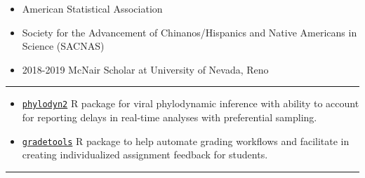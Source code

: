 \documentclass{article}
\begin{document}
	
	
	\begin{description}
		\vspace{-2mm}
		\item[Programs and Professional Membership]\hspace*{.01in}
		
		\begin{itemize}
			\item American Statistical Association
			
			\item Society for the Advancement of Chinanos/Hispanics and Native Americans in Science (SACNAS)
			
			\item 2018-2019 McNair Scholar at University of Nevada, Reno
		\end{itemize}
	\end{description}
	\vspace{-2mm}
	\rule{\linewidth}{1pt}
	
	\newpage
	\begin{description}
		\vspace{-2mm}
		\item[Software Developed]\hspace*{.1in}
		
		\begin{itemize}
			\item \href{https://github.com/CatalinaMedina/phylodyn2}{\texttt{phylodyn2}} R package for viral phylodynamic inference with ability to account for reporting delays in real-time analyses with preferential sampling.
			
			\item \href{https://federicazoe.github.io/gradetools/}{\texttt{gradetools}} R package to help automate grading workflows and facilitate in creating individualized assignment feedback for students.
		\end{itemize}
	\end{description}
	\vspace{-2mm}
	\rule{\linewidth}{1pt}
	
	
\end{document}
